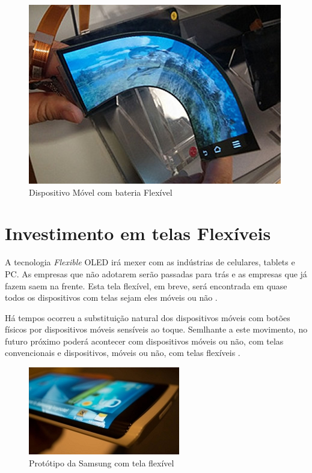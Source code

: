 \begin{figure}[!h]
  \centering
  \includegraphics[width=.60\textwidth]{./figuras/flexible-battery} 
  \caption{Dispositivo Móvel com bateria Flexível}
  \label{fig:flexible-battery} 
\end{figure}


\section{Investimento em telas Flexíveis}
\label{sec:investimento}

A tecnologia \textit{Flexible} OLED irá mexer com as indústrias de celulares, tablets e PC. As empresas que não adotarem serão passadas para trás e as empresas que já fazem saem na frente. Esta tela flexível, em breve, será encontrada em quase todos os dispositivos com telas sejam eles móveis ou não \cite{FSIJS}.

Há tempos ocorreu a substituição natural dos dispositivos móveis com botões físicos por dispositivos móveis sensíveis ao toque. Semlhante a este movimento, no futuro próximo poderá acontecer com dispositivos móveis ou não, com telas convencionais e dispositivos, móveis ou não, com telas flexíveis \cite{FSIJS}.

\begin{figure}[!h]
  \centering
  \includegraphics[width=.40\textwidth]{./figuras/oled-samsung-device} 
  \caption{Protótipo da Samsung com tela flexível}
  \label{fig:oled-samsung-device} 
\end{figure}

